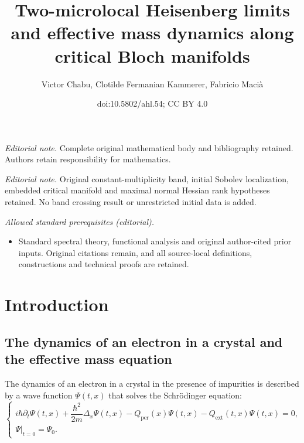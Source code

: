 \documentclass[10pt]{amsart}
\title{Two-microlocal Heisenberg limits and effective mass dynamics along critical Bloch manifolds}
\author{Victor Chabu, Clotilde Fermanian Kammerer, Fabricio Macià}
\date{doi:10.5802/ahl.54; CC BY 4.0}
\theoremstyle{definition}
\DeclareMathOperator{\ext}{ext}
\DeclareMathOperator{\per}{per}
\numberwithin{equation}{section}
\begin{document}
\maketitle
\noindent\textit{Editorial note.} Complete original mathematical body and bibliography retained. Authors retain responsibility for mathematics.\par\medskip
\noindent\textit{Editorial note.} Original constant-multiplicity band, initial Sobolev localization, embedded critical manifold and maximal normal Hessian rank hypotheses retained. No band crossing result or unrestricted initial data is added.\par\medskip
\noindent\textit{Allowed standard prerequisites (editorial).}\begin{itemize}
\item Standard spectral theory, functional analysis and original author-cited prior inputs. Original citations remain, and all source-local definitions, constructions and technical proofs are retained.
\end{itemize}\medskip
\section{Introduction}

\subsection{The dynamics of an electron in a crystal and the effective mass equation}
The dynamics of an electron in a crystal in the presence of impurities is described by a wave function $\Psi(t,x)$ that solves the Schr\"odinger equation:
\begin{equation}\label{eq:schrodbrut}
\begin{cases}
i\hbar\partial_t \Psi(t,x) +\dfrac{\hbar^2}{2m} \Delta_x \Psi(t,x) - Q_{\per}\left(x\right)\Psi(t,x) - Q_{\ext}(t,x)\Psi(t,x) =0,\\
\Psi |_{t=0}=\Psi_0.
\end{cases}
\end{equation}
\end{document}

